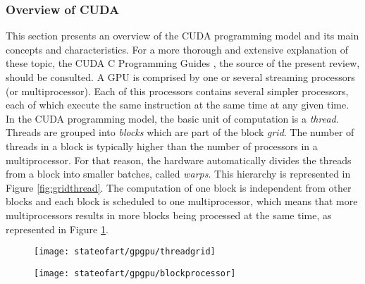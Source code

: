 





\subsubsection{Overview of CUDA}


This section presents an overview of the CUDA programming model and its main concepts and characteristics.
For a more thorough and extensive explanation of these topic, the CUDA C Programming Guides \cite{Nvidia2014}, the source of the present review, should be consulted.
A GPU is comprised by one or several streaming processors (or multiprocessor).
Each of this processors contains several simpler processors, each of which execute the same instruction at the same time at any given time.
In the CUDA programming model, the basic unit of computation is a \emph{thread}.
Threads are grouped into \emph{blocks} which are part of the block \emph{grid}.
The number of threads in a block is typically higher than the number of processors in a multiprocessor.
For that reason, the hardware automatically divides the threads from a block into smaller batches, called \emph{warps}.
This hierarchy is represented in Figure \ref{fig:gridthread}.
The computation of one block is independent from other blocks and each block is scheduled to one multiprocessor, which means that more multiprocessors results in more blocks being processed at the same time, as represented in Figure \ref{fig:blockprocessor}.

\begin{figure}[ht]
\centering
\begin{minipage}[b]{.45\textwidth}
	\centering
	\texttt{[image: stateofart/gpgpu/threadgrid]}
	\label{fig:gridthread}  
\end{minipage}
\begin{minipage}[b]{.45\textwidth}
    \centering
    \texttt{[image: stateofart/gpgpu/blockprocessor]}
    \label{fig:blockprocessor}
\end{minipage}
\end{figure}

